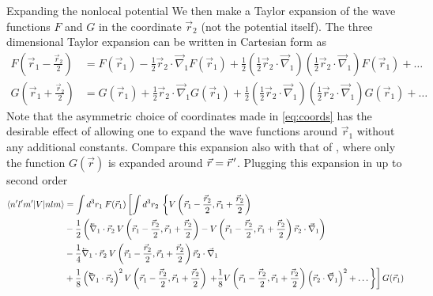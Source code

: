 \begin{section}{Expanding the nonlocal potential}
We then make a Taylor expansion of the wave functions $F$ and $G$ in the coordinate $\vec{r}_2$ (not the potential itself). The three dimensional Taylor expansion can be written in Cartesian form as
\begin{align}\label{eq:TaylorExpansion}
F\left(\vec{r}_1-\frac{\vec{r}_2}{2}\right)&=F(\vec{r}_1)-\frac{1}{2}\vec{r}_2\cdot\vec{\nabla}_1 F(\vec{r}_1)+\frac{1}{2}\left(\frac{1}{2}\vec{r}_2\cdot\vec{\nabla}_1\right)\left(\frac{1}{2}\vec{r}_2\cdot\vec{\nabla}_1\right)F(\vec{r}_1)+\dots 
\\
G\left(\vec{r}_1+\frac{\vec{r}_2}{2}\right)&=G(\vec{r}_1)+\frac{1}{2}\vec{r}_2\cdot\vec{\nabla}_1 G(\vec{r}_1)+\frac{1}{2}\left(\frac{1}{2}\vec{r}_2\cdot\vec{\nabla}_1\right)\left(\frac{1}{2}\vec{r}_2\cdot\vec{\nabla}_1\right)G(\vec{r}_1)+\dots
\end{align}
Note that the asymmetric choice of coordinates made in \eqref{eq:coords} has the desirable effect of allowing one to expand the wave functions around $\vec{r}_1$ without any additional constants. Compare this expansion also with that of \cite{0954-3899-26-3-310}, where only the function $G(\vec{r})$ is expanded around $\vec{r}=\vec{r}\mkern2mu'$. Plugging this expansion in up to second order 
\begin{equation}\label{eq:expansionCartesian}
\begin{split}
\braket{n' l' m'| V | n l m} &= \int d^3r_1\: F(\vec{r}_1)\left[\int d^3r_2\:\left\{V\left(\vec{r}_1-\frac{\vec{r}_2}{2},\vec{r}_1+\frac{\vec{r}_2}{2}\right) \right.\right. \\
&-\frac{1}{2} \left(\lvec{\nabla}_1\cdot\vec{r}_2\: V\left(\vec{r}_1-\frac{\vec{r}_2}{2},\vec{r}_1+\frac{\vec{r}_2}{2}\right) -
V\left(\vec{r}_1-\frac{\vec{r}_2}{2},\vec{r}_1+\frac{\vec{r}_2}{2}\right) \vec{r}_2\cdot\vec{\nabla}_1
\right)\\
&-\frac{1}{4}\lvec{\nabla}_1\cdot\vec{r}_2\: V\left(\vec{r}_1-\frac{\vec{r}_2}{2},\vec{r}_1+\frac{\vec{r}_2}{2}\right) \vec{r}_2\cdot\vec{\nabla}_1\\
&+\frac{1}{8}\left(\lvec{\nabla}_{1}\cdot\vec{r}_2\right)^2 V\left(\vec{r}_1-\frac{\vec{r}_2}{2},\vec{r}_1+\frac{\vec{r}_2}{2}\right) 
\left.\left.+\frac{1}{8} V\left(\vec{r}_1-\frac{\vec{r}_2}{2},\vec{r}_1+\frac{\vec{r}_2}{2}\right) \left(\vec{r}_2\cdot\vec{\nabla}_{1}\right)^2+\dots \right\}\right]G(\vec{r}_1)
\end{split}
\end{equation}


\end{section}
